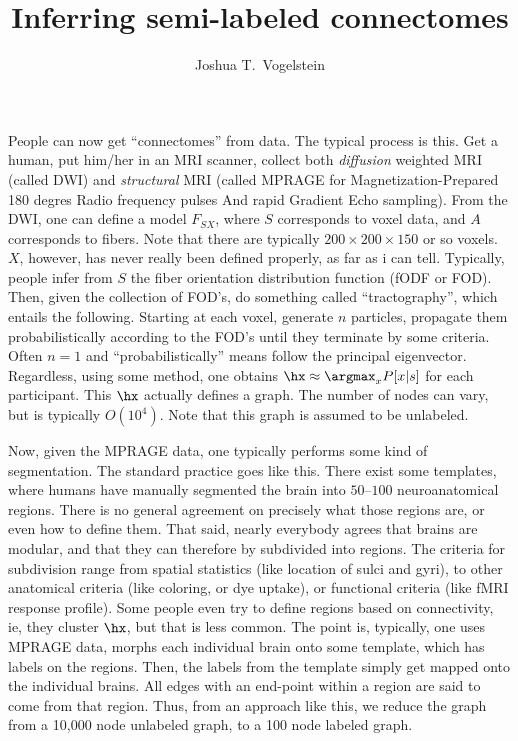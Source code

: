 


\title{Inferring semi-labeled connectomes}

\author{Joshua T.~Vogelstein}



\maketitle
% 

People can now get ``connectomes'' from data.  The typical process is this.  Get a human, put him/her in an MRI scanner, collect both \emph{diffusion} weighted MRI (called DWI) and \emph{structural} MRI (called MPRAGE for Magnetization-Prepared 180 degres Radio frequency pulses And rapid Gradient Echo sampling).  From the DWI, one can define a model $F_{SX}$, where $S$ corresponds to voxel data, and $A$ corresponds to fibers.  Note that there are typically $200\times 200 \times 150$ or so voxels.  $X$, however, has never really been defined properly, as far as i can tell.  Typically, people infer from $S$ the fiber orientation distribution function (fODF or FOD).  Then, given the collection of FOD's, do something called ``tractography'', which entails the following.  Starting at each voxel, generate $n$ particles, propagate them probabilistically according to the FOD's until they terminate by some criteria.  Often $n=1$ and ``probabilistically'' means follow the principal eigenvector.  Regardless, using some method, one obtains $\hx\approx \argmax_x P[x | s]$ for each participant.  This $\hx$ actually defines a graph.  The number of nodes can vary, but is typically $O(10^4)$.  Note that this graph is assumed to be unlabeled.  

Now, given the MPRAGE data, one typically performs some kind of segmentation.  The standard practice goes like this.  There exist some templates, where humans have manually segmented the brain into $50$--$100$ neuroanatomical regions.  There is no general agreement on precisely what those regions are, or even how to define them.  That said, nearly everybody agrees that brains are modular, and that they can therefore by subdivided into regions.  The criteria for subdivision range from spatial statistics (like location of sulci and gyri), to other anatomical criteria (like coloring, or dye uptake), or functional criteria (like fMRI response profile).  Some people even try to define regions based on connectivity, ie, they cluster $\hx$, but that is less common.  The point is, typically, one uses MPRAGE data, morphs each individual brain onto some template, which has labels on the regions.  Then, the labels from the template simply get mapped onto the individual brains.  All edges with an end-point within a region are said to come from that region.  Thus, from an approach like this, we reduce the graph from a 10,000 node unlabeled graph, to a 100 node labeled graph.

